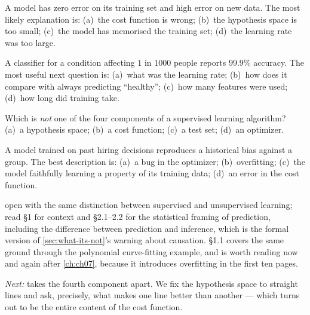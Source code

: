 \qz A model has zero error on its training set and high error on new data. The
most likely explanation is: (a)~the cost function is wrong; (b)~the hypothesis
space is too small; (c)~the model has memorised the training set; (d)~the
learning rate was too large.

\qz A classifier for a condition affecting $1$ in $1000$ people reports $99.9\%$
accuracy. The most useful next question is: (a)~what was the learning rate;
(b)~how does it compare with always predicting ``healthy''; (c)~how many
features were used; (d)~how long did training take.

\qz Which is \emph{not} one of the four components of a supervised learning
algorithm? (a)~a hypothesis space; (b)~a cost function; (c)~a test set;
(d)~an optimizer.

\qz A model trained on past hiring decisions reproduces a historical bias against
a group. The best description is: (a)~a bug in the optimizer; (b)~overfitting;
(c)~the model faithfully learning a property of its training data;
(d)~an error in the cost function.

\furtherreading

\textcite{james2021} open with the same distinction between supervised and
unsupervised learning; read §1 for context and §2.1--2.2 for the statistical
framing of prediction, including the difference between prediction and
inference, which is the formal version of \cref{sec:what-its-not}'s warning
about causation. \textcite{bishop2006} §1.1 covers the same ground through the
polynomial curve-fitting example, and is worth reading now and again after
\cref{ch:ch07}, because it introduces overfitting in the first ten pages.

\bigskip
\noindent\emph{Next:}  takes the fourth component apart. We fix the
hypothesis space to straight lines and ask, precisely, what makes one line better
than another --- which turns out to be the entire content of the cost function.
